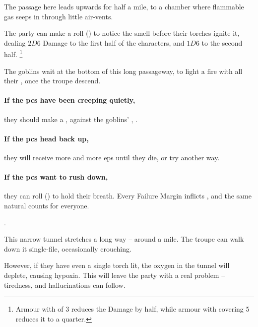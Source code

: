 \begin{multicols}{2}

The passage here leads upwards for half a mile, to a chamber where flammable gas seeps in through little air-vents.

The party can make a  roll (\tn[12]) to notice the smell before their torches ignite it, dealing $2D6$ Damage to the first half of the characters, and $1D6$ to the second half.%
\footnote{Armour with  of 3 reduces the Damage by half, while armour with \gls{covering} 5 reduces it to a quarter.}



The goblins wait at the bottom of this long passageway, to light a fire with all their \fireFuel, once the troupe descend.

\paragraph{If the \glspl{pc} have been creeping quietly,}
they should make a , against the goblins' , \tn.

\paragraph{If the \glspl{pc} head back up,}
they will receive more and more \glspl{ep} until they die, or try another way.

\paragraph{If the \glspl{pc} want to rush down,}
they can roll  (\tn[10]) to hold their breath.
Every Failure Margin inflicts , and the same \gls{natural} counts for everyone.

.


This narrow tunnel stretches a long way -- around a mile.
The troupe can walk down it single-file, occasionally crouching.

However, if they have even a single torch lit, the oxygen in the tunnel will deplete, causing \gls{hypoxia}.
This will leave the party with a real problem -- tiredness, and hallucinations can follow.


\end{multicols}
